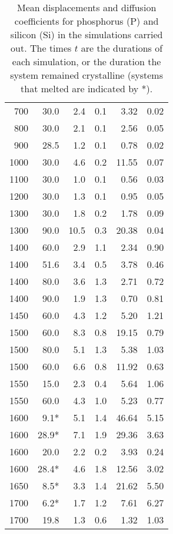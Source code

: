 \documentclass[11pt,bibliography=totoc,index=totoc]{scrbook}   %
\begin{document}
\begin{table}[htbp]
\begin{tabular}{rrrrrr}
         700 & 30.0  &  2.4 &  0.1 &  3.32 &  0.02 \\
         800 & 30.0  &  2.1 &  0.1 &  2.56 &  0.05 \\
         900 & 28.5  &  1.2 &  0.1 &  0.78 &  0.02 \\
        1000 & 30.0  &  4.6 &  0.2 & 11.55 &  0.07 \\
        1100 & 30.0  &  1.0 &  0.1 &  0.56 &  0.03 \\
        1200 & 30.0  &  1.3 &  0.1 &  0.95 &  0.05 \\
        1300 & 30.0  &  1.8 &  0.2 &  1.78 &  0.09 \\
        1300 & 90.0  & 10.5 &  0.3 & 20.38 &  0.04 \\
        1400 & 60.0  &  2.9 &  1.1 &  2.34 &  0.90 \\
        1400 & 51.6  &  3.4 &  0.5 &  3.78 &  0.46 \\
        1400 & 80.0  &  3.6 &  1.3 &  2.71 &  0.72 \\
        1400 & 90.0  &  1.9 &  1.3 &  0.70 &  0.81 \\
        1450 & 60.0  &  4.3 &  1.2 &  5.20 &  1.21 \\
        1500 & 60.0  &  8.3 &  0.8 & 19.15 &  0.79 \\
        1500 & 80.0  &  5.1 &  1.3 &  5.38 &  1.03 \\
        1500 & 60.0  &  6.6 &  0.8 & 11.92 &  0.63 \\
        1550 & 15.0  &  2.3 &  0.4 &  5.64 &  1.06 \\
        1550 & 60.0  &  4.3 &  1.0 &  5.23 &  0.77 \\
        1600 &  9.1* &  5.1 &  1.4 & 46.64 &  5.15 \\
        1600 & 28.9* &  7.1 &  1.9 & 29.36 &  3.63 \\
        1600 & 20.0  &  2.2 &  0.2 &  3.93 &  0.24 \\
        1600 & 28.4* &  4.6 &  1.8 & 12.56 &  3.02 \\
        1650 &  8.5* &  3.3 &  1.4 & 21.62 &  5.50 \\
        1700 &  6.2* &  1.7 &  1.2 &  7.61 &  6.27 \\
        1700 & 19.8  &  1.3 &  0.6 &  1.32 &  1.03 \\
    \bottomrule
  \end{tabular}
  \caption{Mean displacements and diffusion coefficients  
    for phosphorus (P) and silicon (Si) in the simulations carried out. 
    The times $t$ are the durations of each simulation, or the duration the system remained crystalline 
    (systems that melted are indicated by *).
    }
  \label{tab:displacements}
\end{table}
\end{document}
